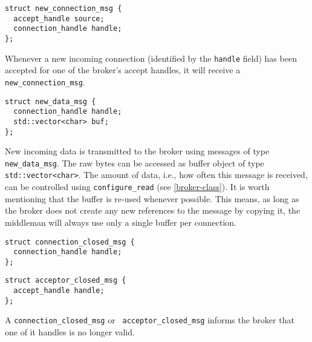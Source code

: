 \begin{lstlisting}
struct new_connection_msg {
  accept_handle source;
  connection_handle handle;
};
\end{lstlisting}

Whenever a new incoming connection (identified by the \lstinline^handle^ field) has been accepted for one of the broker's accept handles, it will receive a \lstinline^new_connection_msg^.

\begin{lstlisting}
struct new_data_msg {
  connection_handle handle;
  std::vector<char> buf;
};
\end{lstlisting}

New incoming data is transmitted to the broker using messages of type \lstinline^new_data_msg^.
The raw bytes can be accessed as buffer object of type \lstinline^std::vector<char>^.
The amount of data, i.e., how often this message is received, can be controlled using \lstinline^configure_read^ (see \ref{broker-class}).
It is worth mentioning that the buffer is re-used whenever possible.
This means, as long as the broker does not create any new references to the message by copying it, the middleman will always use only a single buffer per connection.

\begin{lstlisting}
struct connection_closed_msg {
  connection_handle handle;
};
\end{lstlisting}

\begin{lstlisting}
struct acceptor_closed_msg {
  accept_handle handle;
};
\end{lstlisting}


A \lstinline^connection_closed_msg^ or \lstinline^ acceptor_closed_msg^ informs the broker that one of it handles is no longer valid.

